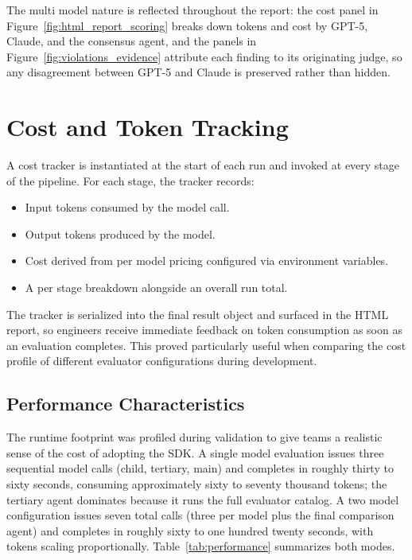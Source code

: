 \documentclass[12pt, a4paper, oneside]{report}
\begin{document}
The multi model nature is reflected throughout the report: the cost panel in Figure~\ref{fig:html_report_scoring} breaks down tokens and cost by GPT-5, Claude, and the consensus agent, and the panels in Figure~\ref{fig:violations_evidence} attribute each finding to its originating judge, so any disagreement between GPT-5 and Claude is preserved rather than hidden.

\section{Cost and Token Tracking}

A cost tracker is instantiated at the start of each run and invoked at every stage of the pipeline. For each stage, the tracker records:

\begin{itemize}
    \item Input tokens consumed by the model call.
    \item Output tokens produced by the model.
    \item Cost derived from per model pricing configured via environment variables.
    \item A per stage breakdown alongside an overall run total.
\end{itemize}

The tracker is serialized into the final result object and surfaced in the HTML report, so engineers receive immediate feedback on token consumption as soon as an evaluation completes. This proved particularly useful when comparing the cost profile of different evaluator configurations during development.

\subsection{Performance Characteristics}

The runtime footprint was profiled during validation to give teams a realistic sense of the cost of adopting the SDK. A single model evaluation issues three sequential model calls (child, tertiary, main) and completes in roughly thirty to sixty seconds, consuming approximately sixty to seventy thousand tokens; the tertiary agent dominates because it runs the full evaluator catalog. A two model configuration issues seven total calls (three per model plus the final comparison agent) and completes in roughly sixty to one hundred twenty seconds, with tokens scaling proportionally. Table~\ref{tab:performance} summarizes both modes.
\end{document}
